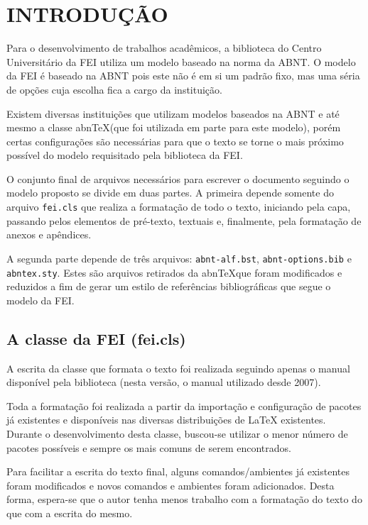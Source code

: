 \chapter{INTRODUÇÃO}

Para o desenvolvimento de trabalhos acadêmicos, a biblioteca do Centro Universitário da FEI utiliza um modelo baseado na norma da ABNT. O modelo da FEI é baseado na ABNT pois este não é em si um padrão fixo, mas uma séria de opções cuja escolha fica a cargo da instituição.

Existem diversas instituições que utilizam modelos baseados na ABNT e até mesmo a classe abn\TeX (que foi utilizada em parte para este modelo), porém certas configurações são necessárias para que o texto se torne o mais próximo possível do modelo requisitado pela biblioteca da FEI.

O conjunto final de arquivos necessários para escrever o documento seguindo o modelo proposto se divide em duas partes. A primeira depende somente do arquivo \texttt{fei.cls} que realiza a formatação de todo o texto, iniciando pela capa, passando pelos elementos de pré-texto, textuais e, finalmente, pela formatação de anexos e apêndices. 

A segunda parte depende de três arquivos: \texttt{abnt-alf.bst}, \texttt{abnt-options.bib} e \texttt{abntex.sty}. Estes são arquivos retirados da abn\TeX que foram modificados e reduzidos a fim de gerar um estilo de referências bibliográficas que segue o modelo da FEI.

\section{A classe da FEI (fei.cls)}

A escrita da classe que formata o texto foi realizada seguindo apenas o manual disponível pela biblioteca (nesta versão, o manual utilizado desde 2007).

Toda a formatação foi realizada a partir da importação e configuração de pacotes já existentes e disponíveis nas diversas distribuições de \LaTeX{} existentes. Durante o desenvolvimento desta classe, buscou-se utilizar o menor número de pacotes possíveis e sempre os mais comuns de serem encontrados.

Para facilitar a escrita do texto final, alguns comandos/ambientes já existentes foram modificados e novos comandos e ambientes foram adicionados. Desta forma, espera-se que o autor tenha menos trabalho com a formatação do texto do que com a escrita do mesmo.

